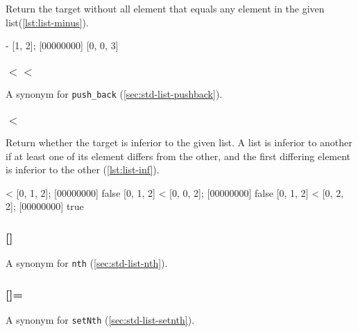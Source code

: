 Return the target without all element that equals any element in the
given list(\autoref{lst:list-minus}).

\begin{urbiscript}[caption=List.'', label=lst:list-minus,
  float=\floatpos]
  [0, 1, 0, 2, 3] - [1, 2];
  [00000000] [0, 0, 3]
\end{urbiscript}

\subsubsection{$<<$}

A synonym for \lstinline|push_back| (\autoref{sec:std-list-pushback}).

\subsubsection{$<$}

Return whether the target is inferior to the given list. A list is
inferior to another if at least one of its element differs from the
other, and the first differing element is inferior to the other
(\autoref{lst:list-inf}).

\begin{urbiscript}[caption=List.'', label=lst:list-inf,
  float=\floatpos]
  [0, 1, 2] < [0, 1, 2];
  [00000000] false
  [0, 1, 2] < [0, 0, 2];
  [00000000] false
  [0, 1, 2] < [0, 2, 2];
  [00000000] true
\end{urbiscript}

\subsubsection{[]}
A synonym for \lstinline|nth| (\autoref{sec:std-list-nth}).

\subsubsection{[]=}
A synonym for \lstinline|setNth| (\autoref{sec:std-list-setnth}).

